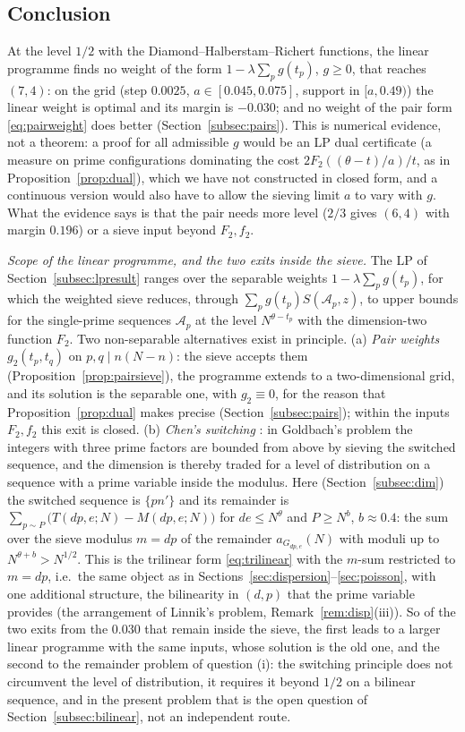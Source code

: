 \documentclass[11pt]{amsart}
\theoremstyle{remark}
\newcommand{\cA}{\mathcal{A}}
\begin{document}
\subsection{Conclusion}
At the level $1/2$ with the Diamond--Halberstam--Richert functions, the linear programme finds no weight of the form $1-\lambda\sum_pg(t_p)$, $g\ge0$, that reaches $(7,4)$: on the grid (step $0.0025$, $a\in[0.045,0.075]$, support in $[a,0.49)$) the linear weight is optimal and its margin is $-0.030$; and no weight of the pair form \eqref{eq:pairweight} does better (Section~\ref{subsec:pairs}). This is numerical evidence, not a theorem: a proof for all admissible $g$ would be an LP dual certificate (a measure on prime configurations dominating the cost $2F_2((\theta-t)/a)/t$, as in Proposition~\ref{prop:dual}), which we have not constructed in closed form, and a continuous version would also have to allow the sieving limit $a$ to vary with $g$. What the evidence says is that the pair needs more level ($2/3$ gives $(6,4)$ with margin $0.196$) or a sieve input beyond $F_2,f_2$.

\emph{Scope of the linear programme, and the two exits inside the sieve.} The LP of Section~\ref{subsec:lpresult} ranges over the separable weights $1-\lambda\sum_pg(t_p)$, for which the weighted sieve reduces, through $\sum_pg(t_p)S(\cA_p,z)$, to upper bounds for the single-prime sequences $\cA_p$ at the level $N^{\theta-t_p}$ with the dimension-two function $F_2$. Two non-separable alternatives exist in principle. (a) \emph{Pair weights} $g_2(t_p,t_q)$ on $p,q\mid n(N-n)$: the sieve accepts them (Proposition~\ref{prop:pairsieve}), the programme extends to a two-dimensional grid, and its solution is the separable one, with $g_2\equiv0$, for the reason that Proposition~\ref{prop:dual} makes precise (Section~\ref{subsec:pairs}); within the inputs $F_2,f_2$ this exit is closed. (b) \emph{Chen's switching} \cite{ChenJR}: in Goldbach's problem the integers with three prime factors are bounded from above by sieving the switched sequence, and the dimension is thereby traded for a level of distribution on a sequence with a prime variable inside the modulus. Here (Section~\ref{subsec:dim}) the switched sequence is $\{pn'\}$ and its remainder is $\sum_{p\sim P}\bigl(T(dp,e;N)-M(dp,e;N)\bigr)$ for $de\le N^\theta$ and $P\ge N^b$, $b\approx0.4$: the sum over the sieve modulus $m=dp$ of the remainder $a_{G_{dp,e}}(N)$ with moduli up to $N^{\theta+b}>N^{1/2}$. This is the trilinear form \eqref{eq:trilinear} with the $m$-sum restricted to $m=dp$, i.e.\ the same object as in Sections~\ref{sec:dispersion}--\ref{sec:poisson}, with one additional structure, the bilinearity in $(d,p)$ that the prime variable provides (the arrangement of Linnik's problem, Remark~\ref{rem:disp}(iii)). So of the two exits from the $0.030$ that remain inside the sieve, the first leads to a larger linear programme with the same inputs, whose solution is the old one, and the second to the remainder problem of question (i): the switching principle does not circumvent the level of distribution, it requires it beyond $1/2$ on a bilinear sequence, and in the present problem that is the open question of Section~\ref{subsec:bilinear}, not an independent route.
\end{document}
